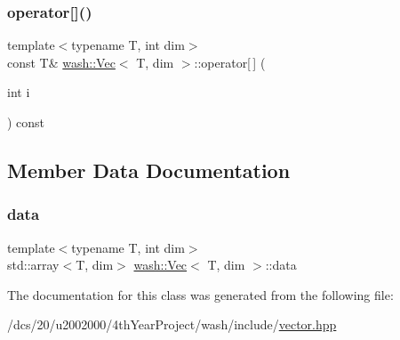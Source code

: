 \mbox{\label{classwash_1_1Vec_a751a7a202ad5e726937568887700a954}} 
\subsubsection{\texorpdfstring{operator[]()}{operator[]()}\hspace{0.1cm}{\footnotesize\ttfamily [2/2]}}
{\footnotesize\ttfamily template$<$typename T, int dim$>$ \\
const T\& \mbox{\hyperlink{classwash_1_1Vec}{wash\+::\+Vec}}$<$ T, dim $>$\+::operator\mbox{[}$\,$\mbox{]} (\begin{DoxyParamCaption}\item[{int}]{i }\end{DoxyParamCaption}) const\hspace{0.3cm}{\ttfamily [inline]}}



\subsection{Member Data Documentation}
\mbox{\label{classwash_1_1Vec_a1f8030900a506e51197d5af4ec4d1143}} 
\subsubsection{\texorpdfstring{data}{data}}
{\footnotesize\ttfamily template$<$typename T, int dim$>$ \\
std\+::array$<$T, dim$>$ \mbox{\hyperlink{classwash_1_1Vec}{wash\+::\+Vec}}$<$ T, dim $>$\+::data}



The documentation for this class was generated from the following file\+:\begin{DoxyCompactItemize}
\item 
/dcs/20/u2002000/4th\+Year\+Project/wash/include/\mbox{\hyperlink{vector_8hpp}{vector.\+hpp}}\end{DoxyCompactItemize}
